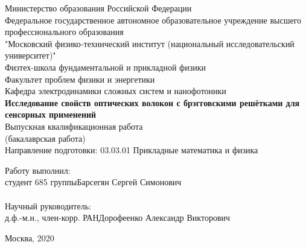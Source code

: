 \begin{center}
	
	
	\large
    Министерство образования Российской Федерации\\
    \vspace{1cm}
	Федеральное государственное автономное образовательное учреждение
		высшего профессионального образования\\
		"Московский физико-технический институт (национальный исследовательский университет)"\\
	\vspace{0.5cm}
    Физтех-школа фундаментальной и прикладной физики\\
    \vspace{0.5cm}
	Факультет проблем физики и энергетики\\
	\vspace{0.5cm}
	Кафедра электродинамики сложных систем и нанофотоники\\
	\vspace{2cm}
	\textbf{Исследование свойств оптических волокон с брэгговскими решётками для сенсорных применений} \\
	Выпускная квалификационная работа\\
	(бакалаврская работа)\\
	\vspace{1cm}
	Направление подготовки: 03.03.01 Прикладные математика и физика
	
\end{center}
\vspace{1.0cm}
Работу выполнил:\\ 
студент 685 группы\hspace{1.7cm}\underline{\hspace{2.8cm}}\hspace{0.5cm}Барсегян Сергей Симонович\\
\vspace{1.0cm}\\
Научный руководитель:\\
д.ф.-м.н., член-корр. РАН\hspace{0.5cm}\underline{\hspace{2.8cm}}\hspace{0.5cm}Дорофеенко Александр Викторович\\

\begin{center}
	\vspace{5cm}
	{Москва, 2020}
\end{center}

\thispagestyle{empty}

\pagebreak[4]
\setcounter{page}{1} 


